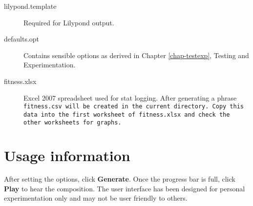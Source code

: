\begin{description}
\item[lilypond.template] Required for Lilypond output.
\item[defaults.opt] Contains sensible options as derived in Chapter \ref{chap-testexp}, Testing and Experimentation.
\item[fitness.xlsx] Excel 2007 spreadsheet used for stat logging. After generating a phrase \tt{fitness.csv} will be
 created in the current directory. Copy this data into the first worksheet of \tt{fitness.xlsx} and check the other
 worksheets for graphs.
\end{description}

\section*{Usage information}

After setting the options, click \textbf{Generate}. Once the progress bar is full, click \textbf{Play} to hear
the composition. The user interface has been designed for personal experimentation only and may not be user
friendly to others.